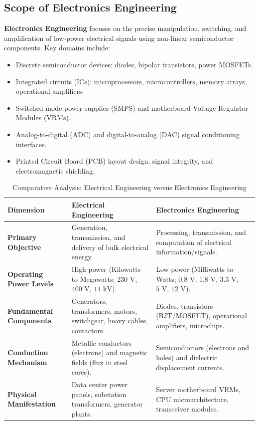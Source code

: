 \subsection{Scope of Electronics Engineering}
\textbf{Electronics Engineering} focuses on the precise manipulation, switching, and amplification of low-power electrical signals using non-linear semiconductor components. Key domains include:
\begin{itemize}
    \item Discrete semiconductor devices: diodes, bipolar transistors, power MOSFETs.
    \item Integrated circuits (ICs): microprocessors, microcontrollers, memory arrays, operational amplifiers.
    \item Switched-mode power supplies (SMPS) and motherboard Voltage Regulator Modules (VRMs).
    \item Analog-to-digital (ADC) and digital-to-analog (DAC) signal conditioning interfaces.
    \item Printed Circuit Board (PCB) layout design, signal integrity, and electromagnetic shielding.
\end{itemize}

\begin{table}[htbp]
\centering
\small
\caption{Comparative Analysis: Electrical Engineering versus Electronics Engineering}
\label{tab:electrical_vs_electronics}
\begin{tabularx}{\textwidth}{l X X}
\toprule
\textbf{Dimension} & \textbf{Electrical Engineering} & \textbf{Electronics Engineering} \\
\midrule
\textbf{Primary Objective} & Generation, transmission, and delivery of bulk electrical energy. & Processing, transmission, and computation of electrical information/signals. \\
\textbf{Operating Power Levels} & High power (Kilowatts to Megawatts; $230\text{ V}$, $400\text{ V}$, $11\text{ kV}$). & Low power (Milliwatts to Watts; $0.8\text{ V}$, $1.8\text{ V}$, $3.3\text{ V}$, $5\text{ V}$, $12\text{ V}$). \\
\textbf{Fundamental Components} & Generators, transformers, motors, switchgear, heavy cables, contactors. & Diodes, transistors (BJT/MOSFET), operational amplifiers, microchips. \\
\textbf{Conduction Mechanism} & Metallic conductors (electrons) and magnetic fields (flux in steel cores). & Semiconductors (electrons and holes) and dielectric displacement currents. \\
\textbf{Physical Manifestation} & Data center power panels, substation transformers, generator plants. & Server motherboard VRMs, CPU microarchitecture, transceiver modules. \\
\bottomrule
\end{tabularx}
\end{table}



